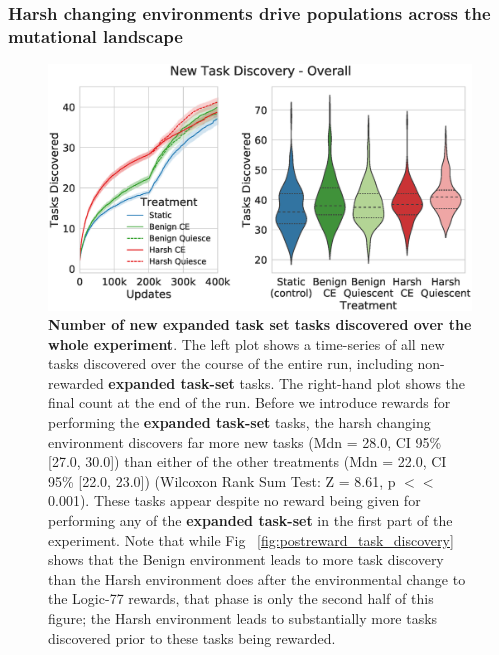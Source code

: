 \documentclass[10pt,letterpaper,final]{article}
\begin{document}
\subsubsection*{Harsh changing environments drive populations across the mutational landscape}
	\begin{figure}[!h]
	\includegraphics[width=0.95\columnwidth]{figures/LTE/fig16.eps}
	\caption{\textbf{Number of new expanded task set tasks discovered over the whole experiment}. The left plot shows a time-series of all new tasks discovered over the course of the entire run, including non-rewarded \textbf{expanded task-set} tasks. The right-hand plot shows the final count at the end of the run. Before we introduce rewards for performing the \textbf{expanded task-set} tasks, the harsh changing environment discovers far more new tasks (Mdn = 28.0, CI 95\% [27.0, 30.0]) than either of the other treatments (Mdn = 22.0, CI 95\% [22.0, 23.0]) (Wilcoxon Rank Sum Test: Z = 8.61, p $<<$ 0.001). These tasks appear despite no reward being given for performing any of the \textbf{expanded task-set} in the first part of the experiment.  %
	Note that while Fig~%
	\ref{fig:postreward_task_discovery} %
	shows that the Benign environment leads to more task discovery than the Harsh environment does after the environmental change to the Logic-77 rewards, that phase is only the second half of this figure; the Harsh environment leads to substantially more tasks discovered prior to these tasks being rewarded.
	}
	\label{fig:simple-overall_task_discovery}
	\end{figure}
\end{document}
